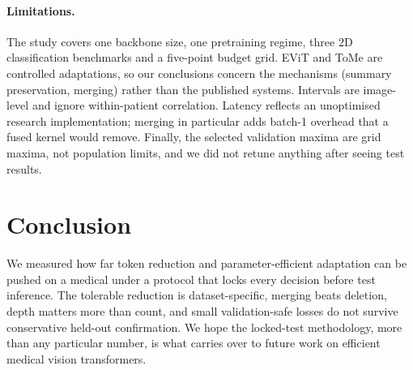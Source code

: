\paragraph{Limitations.}
The study covers one backbone size, one pretraining regime, three 2D classification benchmarks and a five-point budget grid. EViT and ToMe are controlled adaptations, so our conclusions concern the mechanisms (summary preservation, merging) rather than the published systems. Intervals are image-level and ignore within-patient correlation. Latency reflects an unoptimised research implementation; merging in particular adds batch-1 overhead that a fused kernel would remove. Finally, the selected validation maxima are grid maxima, not population limits, and we did not retune anything after seeing test results.

\section{Conclusion}
We measured how far token reduction and parameter-efficient adaptation can be pushed on a medical \deit under a protocol that locks every decision before test inference. The tolerable reduction is dataset-specific, merging beats deletion, depth matters more than count, and small validation-safe losses do not survive conservative held-out confirmation. We hope the locked-test methodology, more than any particular number, is what carries over to future work on efficient medical vision transformers. 

